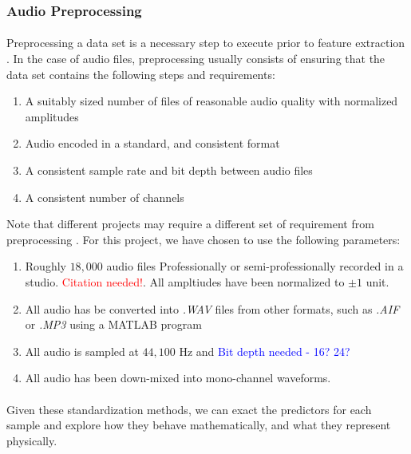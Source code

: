 \documentclass[12pt,letterpaper]{article}
\begin{document}

\subsubsection{Audio Preprocessing}
\label{subsubsec-Preprocessing}

\paragraph*{}Preprocessing a data set is a necessary step to execute prior to feature extraction \cite{Geron2,James,Serizel}. In the case of audio files, preprocessing usually consists of ensuring that the data set contains the following steps and requirements:
\begin{enumerate}
\item A suitably sized number of files of reasonable audio quality with normalized amplitudes
\item Audio encoded in a standard, and consistent format
\item A consistent sample rate and bit depth between audio files
\item A consistent number of channels
\end{enumerate}
Note that different projects may require a different set of requirement from preprocessing \cite{Virtanen}. For this project, we have chosen to use the following parameters:
\begin{enumerate}
\item Roughly $18,000$ audio files Professionally or semi-professionally recorded in a studio. \textcolor{red}{Citation needed!}. All ampltiudes have been normalized to $\pm 1$ unit.
\item All audio has be converted into \textit{.WAV} files from other formats, such as \textit{.AIF} or \textit{.MP3} using a MATLAB program
\item All audio is sampled at $44,100$ Hz and \textcolor{blue}{Bit depth needed - 16? 24?}
\item All audio has been down-mixed into mono-channel waveforms.
\end{enumerate}

\paragraph*{}Given these standardization methods, we can exact the predictors for each sample and explore how they behave mathematically, and what they represent physically.
\end{document}

